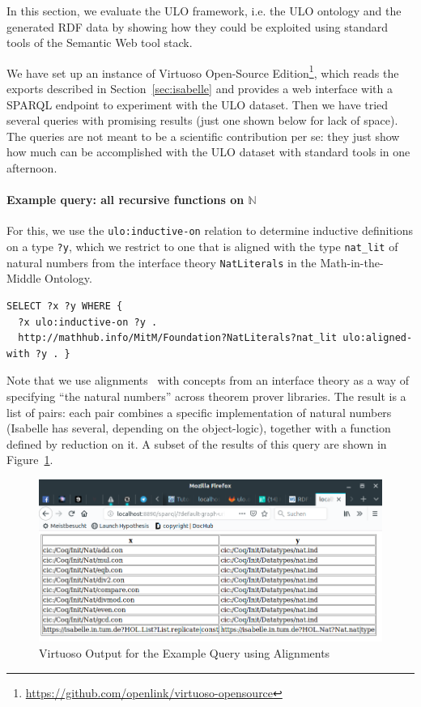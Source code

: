 
In this section, we evaluate the ULO framework, i.e. the ULO ontology and the generated RDF data by showing how they could be exploited using standard tools of the Semantic Web tool stack.

We have set up an instance of Virtuoso Open-Source Edition\footnote{\url{https://github.com/openlink/virtuoso-opensource}}, which reads the exports described in Section~\ref{sec:isabelle} and provides a web interface with a SPARQL endpoint to experiment with the ULO dataset.
Then we have tried several queries with promising results (just one shown below for lack of space).
The queries are not meant to be a scientific contribution per se: they just show how much can be accomplished with the ULO dataset with standard tools in one afternoon.

\paragraph{Example query: all recursive functions on $\mathbb{N}$} For this, we use the \lstinline|ulo:inductive-on| relation to determine inductive definitions on a type \lstinline|?y|, which we restrict to one that is aligned with the type \lstinline|nat_lit| of natural numbers from the interface theory \lstinline|NatLiterals| in the Math-in-the-Middle Ontology.
\begin{lstlisting}
SELECT ?x ?y WHERE {
  ?x ulo:inductive-on ?y .
  http://mathhub.info/MitM/Foundation?NatLiterals?nat_lit ulo:aligned-with ?y . }
\end{lstlisting}
Note that we use alignments~\cite{MueGauKal:cacfms17} with concepts from an interface theory as a way of specifying ``the natural numbers'' across theorem prover libraries. The result is a list of pairs: each pair combines a specific implementation of natural numbers (Isabelle has several, depending on the object-logic), together with a function defined by reduction on it. A subset of the results of this query are shown in Figure~\ref{fig:query}.

\begin{figure}[t]\centering
\includegraphics[width=\textwidth]{ulo_queryresult}
\caption{Virtuoso Output for the Example Query using Alignments}\label{fig:query}
\end{figure}

